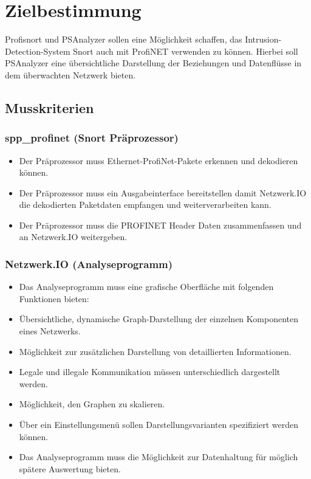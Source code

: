 \chapter{Zielbestimmung}

Profisnort und PSAnalyzer sollen eine Möglichkeit schaffen, das Intrusion-Detection-System Snort auch mit ProfiNET verwenden zu können.
Hierbei soll PSAnalyzer eine übersichtliche Darstellung der Beziehungen und Datenflüsse in dem überwachten Netzwerk bieten.

\section{Musskriterien}

\subsection{spp\_profinet (Snort Präprozessor)}

\begin{itemize}
\item Der Präprozessor muss Ethernet-ProfiNet-Pakete erkennen und dekodieren können.

\item Der Präprozessor muss ein Ausgabeinterface bereitstellen damit Netzwerk.IO die dekodierten Paketdaten empfangen und weiterverarbeiten kann.

\item Der Präprozessor muss die PROFINET Header Daten zusammenfassen und an Netzwerk.IO weitergeben.
\end{itemize}

\subsection{Netzwerk.IO (Analyseprogramm)}

\begin{itemize}
\item Das Analyseprogramm muss eine grafische Oberfläche mit folgenden Funktionen bieten:

\item Übersichtliche, dynamische Graph-Darstellung der einzelnen Komponenten eines Netzwerks.

\item Möglichkeit zur zusätzlichen Darstellung von detaillierten Informationen.

\item Legale und illegale Kommunikation müssen unterschiedlich dargestellt werden.

\item Möglichkeit, den Graphen zu skalieren.

\item Über ein Einstellungsmenü sollen Darstellungsvarianten spezifiziert werden können.

\item Das Analyseprogramm muss die Möglichkeit zur Datenhaltung für möglich spätere Auswertung bieten.
\end{itemize}

